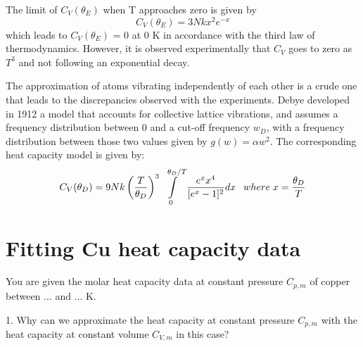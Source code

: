 \documentclass[english]{article}
\begin{document}
{}

The limit of $C_V(\theta_{E})$ when T approaches zero is given by 
\begin{equation}
C_V(\theta_{E})  =3Nkx^{2}e^{-x}
\end{equation}
which leads to $C_V(\theta_{E})$ = 0 at 0 K in accordance with the third law of thermodynamics. However, it is observed experimentally that $C_V$ goes to zero as $T^3$ and not following an exponential decay. 

The approximation of atoms vibrating independently of each other is a crude one that leads to the discrepancies observed with the experiments. Debye developed in 1912 a model that accounts for collective lattice vibrations, and assumes a frequency distribution between 0 and a cut-off frequency $w_D$, with a frequency distribution between those two values given by $g(w) = \alpha w^2$. The corresponding heat capacity model is given by: 
\begin{equation}
C_V(\theta_{D})  =9Nk\left(\frac{T}{\theta_{D}}\right)^{3}\intop_{0}^{\,\,\, \theta_{D}/T}\frac{e^x x^{4}}{[e^x-1]^{2}} dx\;\;\: where\; x=\frac{\theta_{D}}{T}
\end{equation}

\section{Fitting Cu heat capacity data}
You are given the molar heat capacity data at constant pressure $C_{p,m}$ of copper between ... and ... K. 

1. Why can we approximate the heat capacity at constant pressure $C_{p,m}$ with the heat capacity at constant volume $C_{V,m}$ in this case?
\end{document}
